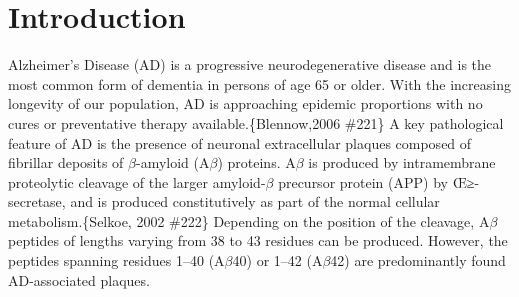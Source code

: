 \chapter{Introduction}

% 

Alzheimer's Disease (AD) is a progressive neurodegenerative disease and is the most common form of dementia in persons of age 65 or older. With the increasing longevity of our population, AD is approaching epidemic proportions with no cures or preventative therapy available.\{Blennow,2006 \#221\} A key pathological feature of AD is the presence of neuronal extracellular plaques composed of fibrillar deposits of $\beta$-amyloid (A$\beta$) proteins. A$\beta$ is produced by intramembrane proteolytic cleavage of the larger amyloid-$\beta$ precursor protein (APP) by Œ≥-secretase, and is produced constitutively as part of the normal cellular metabolism.\{Selkoe, 2002 \#222\} Depending on the position of the cleavage, A$\beta$ peptides of lengths varying from 38 to 43 residues can be produced. However, the peptides spanning residues 1--40 (A$\beta$40) or 1--42 (A$\beta$42) are predominantly found AD-associated plaques.

